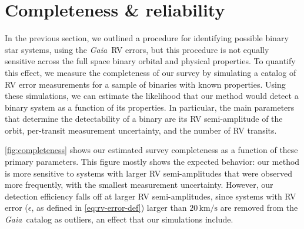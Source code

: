 \documentclass[modern, letterpaper]{aastex631}
\newcommand{\project}[1]{\textsl{#1}}
\newcommand{\Gaia}{\project{Gaia}}
\begin{document}








\section{Completeness \& reliability}

In the previous section, we outlined a procedure for identifying possible binary star systems, using the \Gaia\ RV errors, but this procedure is not equally sensitive across the full space binary orbital and physical properties.
To quantify this effect, we measure the completeness of our survey by simulating a catalog of RV error measurements for a sample of binaries with known properties.
Using these simulations, we can estimate the likelihood that our method would detect a binary system as a function of its properties.
In particular, the main parameters that determine the detectability of a binary are its RV semi-amplitude of the orbit, per-transit measurement uncertainty, and the number of RV transits.

\autoref{fig:completeness} shows our estimated survey completeness as a function of these primary parameters.
This figure mostly shows the expected behavior: our method is more sensitive to systems with larger RV semi-amplitudes that were observed more frequently, with the smallest measurement uncertainty.
However, our detection efficiency falls off at larger RV semi-amplitudes, since systems with RV error ($\epsilon$, as defined in \autoref{eq:rv-error-def}) larger than $20\,\mathrm{km/s}$ are removed from the \Gaia\ catalog as outliers, an effect that our simulations include.
\end{document}
